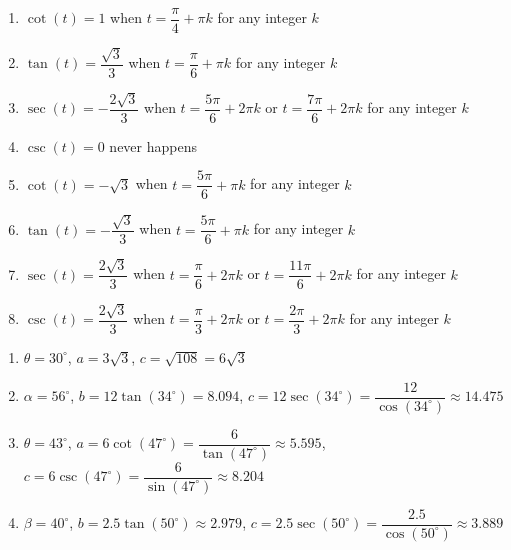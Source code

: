 \begin{enumerate}

\setcounter{enumi}{\value{HW}}

\item $\cot(t) = 1$ when $t = \dfrac{\pi}{4} + \pi k$ for any integer $k$
\item  $\tan(t) = \dfrac{\sqrt{3}}{3}$ when $t = \dfrac{\pi}{6} + \pi k$ for any integer $k$
\item $\sec(t) = -\dfrac{2\sqrt{3}}{3}$ when $t = \dfrac{5\pi}{6} + 2\pi k$ or $t = \dfrac{7\pi}{6} + 2\pi k$ for any integer $k$
\item $\csc(t) = 0$ never happens 
\item $\cot(t) = -\sqrt{3}$ when $t = \dfrac{5\pi}{6} + \pi k$ for any integer $k$
\item $\tan(t) = -\dfrac{\sqrt{3}}{3}$ when $t = \dfrac{5\pi}{6} + \pi k$ for any integer $k$
\item $\sec(t) = \dfrac{2\sqrt{3}}{3}$ when $t = \dfrac{\pi}{6} + 2\pi k$ or $t = \dfrac{11\pi}{6} + 2\pi k$ for any integer $k$
\item $\csc(t) = \dfrac{2\sqrt{3}}{3}$ when $t = \dfrac{\pi}{3} + 2\pi k$ or $t = \dfrac{2\pi}{3} + 2\pi k$ for any integer $k$

\setcounter{HW}{\value{enumi}}

\end{enumerate}

\begin{enumerate}

\setcounter{enumi}{\value{HW}}

\item  $\theta = 30^{\circ}$, $a = 3\sqrt{3}$, $c = \sqrt{108} = 6\sqrt{3}$

\item  $\alpha = 56^{\circ}$, $b = 12 \tan(34^{\circ}) =  8.094$, $c = 12\sec(34^{\circ}) = \dfrac{12}{\cos(34^{\circ})} \approx 14.475$

\item  $\theta = 43^{\circ}$, $a = 6\cot(47^{\circ}) = \dfrac{6}{\tan(47^{\circ})} \approx 5.595$, $c = 6\csc(47^{\circ}) = \dfrac{6}{\sin(47^{\circ})} \approx 8.204$

\item  $\beta = 40^{\circ}$, $b = 2.5 \tan(50^{\circ}) \approx 2.979$, $c = 2.5\sec(50^{\circ}) = \dfrac{2.5}{\cos(50^{\circ})} \approx 3.889$

\setcounter{HW}{\value{enumi}}

\end{enumerate}

